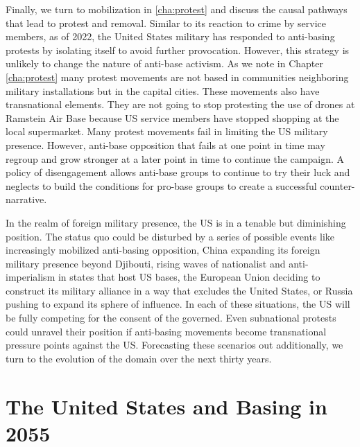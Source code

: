 Finally, we turn to mobilization in \ref{cha:protest} and discuss the causal pathways that lead to protest and removal. Similar to its reaction to crime by service members, as of 2022, the United States military has responded to anti-basing protests by isolating itself to avoid further provocation. However, this strategy is unlikely to change the nature of anti-base activism. As we note in Chapter \ref{cha:protest} many protest movements are not based in communities neighboring military installations but in the capital cities. These movements also have transnational elements. They are not going to stop protesting the use of drones at Ramstein Air Base because US service members have stopped shopping at the local supermarket. Many protest movements fail in limiting the US military presence. However, anti-base opposition that fails at one point in time may regroup and grow stronger at a later point in time to continue the campaign. A policy of disengagement allows anti-base groups to continue to try their luck and neglects to build the conditions for pro-base groups to create a successful counter-narrative. 

In the realm of foreign military presence, the US is in a tenable but diminishing position. The status quo could be disturbed by a series of possible events like increasingly mobilized anti-basing opposition, China expanding its foreign military presence beyond Djibouti, rising waves of nationalist and anti-imperialism in states that host US bases, the European Union deciding to construct its military alliance in a way that excludes the United States, or Russia pushing to expand its sphere of influence. In each of these situations, the US will be fully competing for the consent of the governed. Even subnational protests could unravel their position if anti-basing movements become transnational pressure points against the US.\cite{Cooley2020} Forecasting these scenarios out additionally, we turn to the evolution of the domain over the next thirty years. 



\section*{The United States and Basing in 2055}

